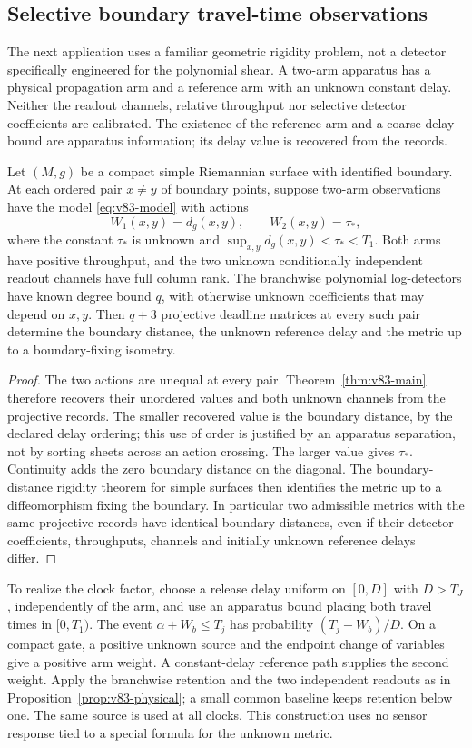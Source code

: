 \subsection{Selective boundary travel-time observations}
The next application uses a familiar geometric rigidity problem,
not a detector specifically engineered for the polynomial shear.
A two-arm apparatus has a physical propagation arm and a reference
arm with an unknown constant delay. Neither the readout channels,
relative throughput nor selective detector coefficients are calibrated.
The existence of the reference arm and a coarse delay bound are
apparatus information; its delay value is recovered from the records.

\begin{theorem}
\label{thm:v84-surface}
Let $(M,g)$ be a compact simple Riemannian surface with identified
boundary. At each ordered pair $x\ne y$ of boundary points, suppose
two-arm observations have the model \eqref{eq:v83-model} with actions
\[
                     W_1(x,y)=d_g(x,y),\qquad W_2(x,y)=\tau_* ,
\]
where the constant $\tau_*$ is unknown and
$\sup_{x,y}d_g(x,y)<\tau_*<T_1$. Both arms have positive throughput,
and the two unknown conditionally independent readout channels have
full column rank. The branchwise polynomial log-detectors have known
degree bound $q$, with otherwise unknown coefficients that may depend
on $x,y$. Then $q+3$ projective deadline matrices at every such pair
determine the boundary distance, the unknown reference delay and the
metric up to a boundary-fixing isometry.
\end{theorem}
\begin{proof}
The two actions are unequal at every pair. Theorem~\ref{thm:v83-main}
therefore recovers their unordered values and both unknown channels
from the projective records. The smaller recovered value is the
boundary distance, by the declared delay ordering; this use of order
is justified by an apparatus separation, not by sorting sheets across
an action crossing. The larger value gives $\tau_*$. Continuity adds
the zero boundary distance on the diagonal. The boundary-distance
rigidity theorem for simple surfaces \cite{V84PU} then identifies the
metric up to a diffeomorphism fixing the boundary. In particular two
admissible metrics with the same projective records have identical
boundary distances, even if their detector coefficients, throughputs,
channels and initially unknown reference delays differ.
\end{proof}
To realize the clock factor, choose a release delay uniform on
$[0,D]$ with $D>T_J$, independently of the arm, and use an apparatus
bound placing both travel times in $[0,T_1)$. The event
$\alpha+W_b\le T_j$ has probability $(T_j-W_b)/D$. On a compact gate,
a positive unknown source and the endpoint change of variables give
a positive arm weight. A constant-delay reference path supplies the
second weight. Apply the branchwise retention and the two independent
readouts as in Proposition~\ref{prop:v83-physical}; a small common
baseline keeps retention below one. The same source is used at all
clocks. This construction uses no sensor response tied to a special
formula for the unknown metric.

